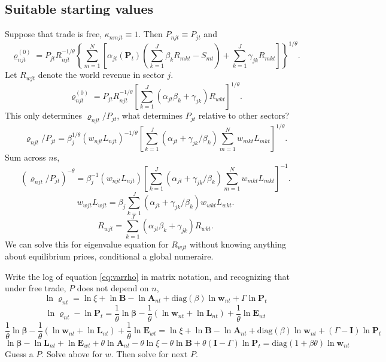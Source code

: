 \documentclass[12pt]{article}
\begin{document}
\subsection{Suitable starting values}
Suppose that trade is free, $\kappa_{nmjt}\equiv 1$. Then $P_{njt}\equiv P_{jt}$ and
\begin{equation*}
	\varrho_{njt}^{(0)} = 
	P_{jt}
	R_{njt}^{-1/\theta}
	\left\{
	\sum_{m=1}^N
		\left[
			\alpha_{jt}(\mathbf P_t)
			\left(
				\sum_{k=1}^J\beta_k R_{mkt} - S_{mt}
			\right)
			+ \sum_{k=1}^J\gamma_{jk}R_{mkt}
		\right]
	\right\}^{1/\theta}.
\end{equation*}
Let $R_{wjt}$ denote the world revenue in sector $j$.
\begin{equation*}
	\varrho_{njt}^{(0)} = 
	P_{jt}
	R_{njt}^{-1/\theta}
		\left[
				\sum_{k=1}^J
				(\alpha_{jt}\beta_k + \gamma_{jk}) R_{wkt}
		\right]^{1/\theta}.
\end{equation*}
This only determines $\varrho_{njt}/P_{jt}$, what determines $P_{jt}$ relative to other sectors?\begin{equation*}
	\varrho_{njt}/P_{jt} = 
	\beta_j^{1/\theta}
	(w_{njt}L_{njt})^{-1/\theta}
		\left[
				\sum_{k=1}^J
				(\alpha_{jt} + \gamma_{jk}/\beta_k) 
				\sum_{m=1}^N w_{mkt}L_{mkt}
		\right]^{1/\theta}.
\end{equation*}
Sum across $n$s,
\begin{equation*}
	(\varrho_{njt}/P_{jt})^{-\theta} = 
	\beta_j^{-1}
	(w_{njt}L_{njt})
		\left[
				\sum_{k=1}^J
				(\alpha_{jt} + \gamma_{jk}/\beta_k) 
				\sum_{m=1}^N w_{mkt}L_{mkt}
		\right]^{-1}.
\end{equation*}
\begin{equation*}
	w_{wjt}L_{wjt}
	= \beta_j
				\sum_{k=1}^J
				(\alpha_{jt} + \gamma_{jk}/\beta_k) 
				w_{wkt}L_{wkt}.
\end{equation*}
\begin{equation*}
	R_{wjt}
	=
			\sum_{k=1}^J
			(\alpha_{jt}\beta_k + \gamma_{jk}) 
			R_{wkt}.
\end{equation*}
We can solve this for eigenvalue equation for $R_{wjt}$ without knowing anything about equilibrium prices, conditional a global numeraire.


Write the log of equation \eqref{eq:varrho} in matrix notation, and recognizing that under free trade, $P$ does not depend on $n$,
\[
\ln\mathbf \varrho_{nt} = \ln\xi
	+ \ln\mathbf B
	- \ln\mathbf A_{nt}
	+ \text{diag}(\beta) \ln\mathbf w_{nt}
	+ \Gamma \ln\mathbf P_{t}  
\]
\[
\ln\mathbf \varrho_{nt} - \ln\mathbf P_{t} 
 = \frac1\theta\ln\mathbf\beta
 	-\frac1\theta(\ln \mathbf w_{nt}+ \ln \mathbf L_{nt})
 	+\frac1\theta \ln \mathbf E_{wt}
\]
\[
\frac1\theta\ln\mathbf\beta
 	-\frac1\theta(\ln \mathbf w_{nt}+ \ln \mathbf L_{nt})
 	+\frac1\theta \ln \mathbf E_{wt}
=
\ln\xi
	+ \ln\mathbf B
	- \ln\mathbf A_{nt}
	+ \text{diag}(\beta) \ln\mathbf w_{nt}
	+ (\Gamma-\mathbf I) \ln\mathbf P_{t}
\]
\[
\ln\mathbf\beta
 	-\ln \mathbf L_{nt}
 	+ \ln \mathbf E_{wt}
	+ \theta\ln\mathbf A_{nt}
	-\theta\ln\xi
	- \theta\ln\mathbf B
	+ \theta(\mathbf I-\Gamma) \ln\mathbf P_{t}
=
	 \text{diag}(1+\beta\theta) \ln\mathbf w_{nt}
\]
Guess a $P$. Solve above for $w$. Then solve for next $P$.
\end{document}
